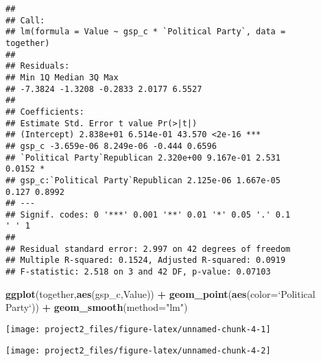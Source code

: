 \documentclass[]{article}
\newenvironment{Shaded}{\begin{snugshade}}{\end{snugshade}}
\newcommand{\CommentTok}[1]{\textcolor[rgb]{0.56,0.35,0.01}{\textit{#1}}}
\newcommand{\DataTypeTok}[1]{\textcolor[rgb]{0.13,0.29,0.53}{#1}}
\newcommand{\DecValTok}[1]{\textcolor[rgb]{0.00,0.00,0.81}{#1}}
\newcommand{\KeywordTok}[1]{\textcolor[rgb]{0.13,0.29,0.53}{\textbf{#1}}}
\newcommand{\NormalTok}[1]{#1}
\newcommand{\OperatorTok}[1]{\textcolor[rgb]{0.81,0.36,0.00}{\textbf{#1}}}
\newcommand{\StringTok}[1]{\textcolor[rgb]{0.31,0.60,0.02}{#1}}
\begin{document}
\begin{verbatim}
##
## Call:
## lm(formula = Value ~ gsp_c * `Political Party`, data =
together)
##
## Residuals:
## Min 1Q Median 3Q Max
## -7.3824 -1.3208 -0.2833 2.0177 6.5527
##
## Coefficients:
## Estimate Std. Error t value Pr(>|t|)
## (Intercept) 2.838e+01 6.514e-01 43.570 <2e-16 ***
## gsp_c -3.659e-06 8.249e-06 -0.444 0.6596
## `Political Party`Republican 2.320e+00 9.167e-01 2.531
0.0152 *
## gsp_c:`Political Party`Republican 2.125e-06 1.667e-05
0.127 0.8992
## ---
## Signif. codes: 0 '***' 0.001 '**' 0.01 '*' 0.05 '.' 0.1
' ' 1
##
## Residual standard error: 2.997 on 42 degrees of freedom
## Multiple R-squared: 0.1524, Adjusted R-squared: 0.0919
## F-statistic: 2.518 on 3 and 42 DF, p-value: 0.07103
\end{verbatim}

\begin{Shaded}
\begin{Highlighting}[]
\KeywordTok{ggplot}\NormalTok{(together,}\KeywordTok{aes}\NormalTok{(gsp_c,Value)) }\OperatorTok{+}\StringTok{ }\KeywordTok{geom_point}\NormalTok{(}\KeywordTok{aes}\NormalTok{(}\DataTypeTok{color=}\StringTok{`}\DataTypeTok{Political Party}\StringTok{`}\NormalTok{)) }\OperatorTok{+}\StringTok{ }\KeywordTok{geom_smooth}\NormalTok{(}\DataTypeTok{method=}\StringTok{"lm"}\NormalTok{)}
\end{Highlighting}
\end{Shaded}

\begin{center}\texttt{[image: project2\_files/figure-latex/unnamed-chunk-4-1]} \end{center}

\begin{Shaded}
\end{Shaded}

\begin{center}\texttt{[image: project2\_files/figure-latex/unnamed-chunk-4-2]} \end{center}
\end{document}
